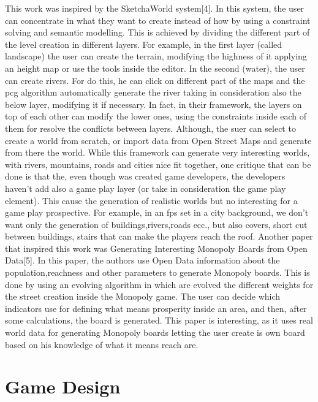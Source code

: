 \documentclass[conference]{IEEEtran}
\begin{document}
This work was inspired by the SketchaWorld system[4]. In this system, the user can concentrate in what they want to create instead of how by using a constraint solving and semantic modelling. This is achieved by dividing the different part of the level creation in different layers. For example, in the first layer (called landscape) the user can create the terrain, modifying the highness of it applying an height map or use the tools inside the editor. In the second (water), the user can create rivers. For do this, he can click on different part of the maps and the pcg algorithm automatically generate the river taking in consideration also the below layer, modifying it if necessary. In fact, in their framework, the layers on top of each other can modify the lower ones, using the constraints inside each of them for resolve the conflicts between layers. Although, the suer can select to create a world from scratch, or import data from Open Street Maps and generate from there the world. \newline
While this framework can generate very interesting worlds, with rivers, mountains, roads and cities nice fit together, one critique that can be done is that the, even though was created game developers, the developers haven't add also a game play layer (or take in consideration the game play element). This cause the generation of realistic worlds but no interesting for a game play prospective. For example, in an fps set in a city background, we don't want only the generation of buildings,rivers,roads ecc., but also covers, short cut between buildings, stairs that can make the players reach the roof. 
\newline
\newline
Another paper that inspired this work was Generating Interesting Monopoly Boards from Open Data[5]. In this paper, the authors use Open Data information about the population,reachness and other parameters to generate Monopoly boards. This is done by using an evolving algorithm in which are evolved the different weights for the street creation inside the Monopoly game. The user can decide which indicators use for defining what means prosperity inside an area, and then, after some calculations, the board is generated. This paper is interesting, as it uses real world data for generating Monopoly boards letting the user create is own board based on his knowledge of what it means reach are.
\newline


\section{Game Design}
\end{document}
